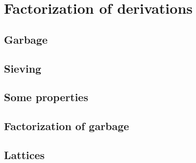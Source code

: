 \chapter{Factorization of derivations}

\section{Garbage}

\section{Sieving}

\section{Some properties}

\section{Factorization of garbage}

\section{Lattices}
